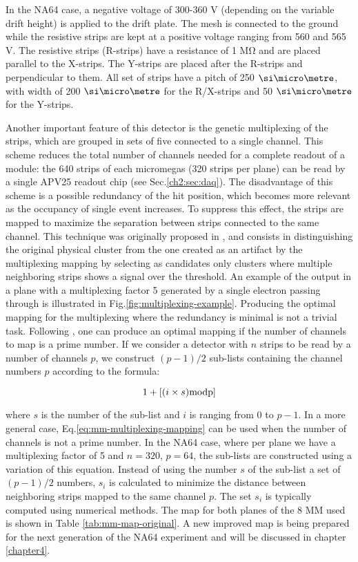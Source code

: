 In the NA64 case, a negative voltage of 300-360 \si{\volt} (depending on the variable drift height) is applied to the drift plate. The mesh is connected to the ground while the resistive strips are kept at a positive voltage ranging from 560 and 565 \si{\volt}. The resistive strips (R-strips) have a resistance of 1 \si{\mega\ohm} and are placed parallel to the X-strips. The Y-strips are placed after the R-strips and perpendicular to them. All set of strips have a pitch of 250 $\mum$, with width of 200 $\mum$ for the R/X-strips and 50 $\mum$ for the Y-strips.

Another important feature of this detector is the genetic multiplexing of the strips, which are grouped in sets of five connected to a single channel. This scheme reduces the total number of channels needed for a complete readout of a module: the 640 strips of each micromegas (320 strips per plane) can be read by a single APV25 readout chip (see Sec.\ref{ch2:sec:daq}). The disadvantage of this scheme is a possible redundancy of the hit position, which becomes more relevant as the occupancy of single event increases. To suppress this effect, the strips are mapped to maximize the separation between strips connected to the same channel. This technique was originally proposed in \cite{Procureur:2013yea}, and consists in distinguishing the original physical cluster from the one created as an artifact by the multiplexing mapping by selecting as candidates only clusters where multiple neighboring strips shows a signal over the threshold. An example of the output in a plane with a multiplexing factor 5 generated by a single electron passing through is illustrated in Fig.\ref{fig:multiplexing-example}. Producing the optimal mapping for the multiplexing where the redundancy is minimal is not a trivial task. Following \cite{Procureur:2013yea}, one can produce an optimal mapping if the number of channels to map is a prime number. If we consider a detector with $n$ strips to be read by a number of channels $p$, we construct $(p-1)/2$ sub-lists containing the channel numbers $p$ according to the formula:

\begin{equation}
\label{eq:mm-multiplexing-mapping}
1 + [(i \times s) \rm{mod} p]
\end{equation}

where $s$ is the number of the sub-list and $i$ is ranging from 0 to $p-1$. In a more general case, Eq.\ref{eq:mm-multiplexing-mapping} can be used when the number of channels is not a prime number. In the NA64 case, where per plane we have a multiplexing factor of 5 and $n=320$, $p=64$, the sub-lists are constructed using a variation of this equation. Instead of using the number $s$ of the sub-list a set of $(p-1)/2$ numbers, $s_i$ is calculated to minimize the distance between neighboring strips mapped to the same channel $p$. The set $s_i$ is typically computed using numerical methods. The map for both planes of the 8 MM used is shown in Table \ref{tab:mm-map-original}. A new improved map is being prepared for the next generation of the NA64 experiment and will be discussed in chapter \ref{chapter4}.

